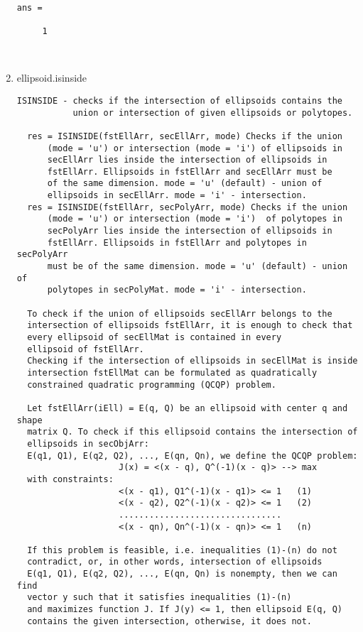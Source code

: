 \begin{enumerate}
\begin{lstlisting}
ans =

     1



\end{lstlisting}
\fontfamily{\familydefault}
\selectfont
\item {ellipsoid.isinside}
\selectfont
\begin{lstlisting}
ISINSIDE - checks if the intersection of ellipsoids contains the
           union or intersection of given ellipsoids or polytopes.

  res = ISINSIDE(fstEllArr, secEllArr, mode) Checks if the union
      (mode = 'u') or intersection (mode = 'i') of ellipsoids in
      secEllArr lies inside the intersection of ellipsoids in
      fstEllArr. Ellipsoids in fstEllArr and secEllArr must be
      of the same dimension. mode = 'u' (default) - union of
      ellipsoids in secEllArr. mode = 'i' - intersection.
  res = ISINSIDE(fstEllArr, secPolyArr, mode) Checks if the union
      (mode = 'u') or intersection (mode = 'i')  of polytopes in
      secPolyArr lies inside the intersection of ellipsoids in
      fstEllArr. Ellipsoids in fstEllArr and polytopes in secPolyArr
      must be of the same dimension. mode = 'u' (default) - union of
      polytopes in secPolyMat. mode = 'i' - intersection.

  To check if the union of ellipsoids secEllArr belongs to the
  intersection of ellipsoids fstEllArr, it is enough to check that
  every ellipsoid of secEllMat is contained in every
  ellipsoid of fstEllArr.
  Checking if the intersection of ellipsoids in secEllMat is inside
  intersection fstEllMat can be formulated as quadratically
  constrained quadratic programming (QCQP) problem.

  Let fstEllArr(iEll) = E(q, Q) be an ellipsoid with center q and shape
  matrix Q. To check if this ellipsoid contains the intersection of
  ellipsoids in secObjArr:
  E(q1, Q1), E(q2, Q2), ..., E(qn, Qn), we define the QCQP problem:
                    J(x) = <(x - q), Q^(-1)(x - q)> --> max
  with constraints:
                    <(x - q1), Q1^(-1)(x - q1)> <= 1   (1)
                    <(x - q2), Q2^(-1)(x - q2)> <= 1   (2)
                    ................................
                    <(x - qn), Qn^(-1)(x - qn)> <= 1   (n)

  If this problem is feasible, i.e. inequalities (1)-(n) do not
  contradict, or, in other words, intersection of ellipsoids
  E(q1, Q1), E(q2, Q2), ..., E(qn, Qn) is nonempty, then we can find
  vector y such that it satisfies inequalities (1)-(n)
  and maximizes function J. If J(y) <= 1, then ellipsoid E(q, Q)
  contains the given intersection, otherwise, it does not.


\end{lstlisting}
\end{enumerate}
